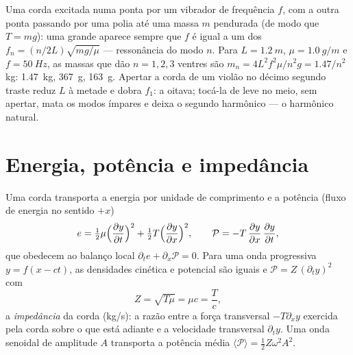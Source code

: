 \begin{example}\label{ex:b2:waves-on-strings:melde}
Uma corda excitada numa ponta por um vibrador de frequência $f$, com a outra ponta
passando por uma polia até uma massa $m$ pendurada (de modo que $T = mg$): uma grande
 aparece sempre que $f$ é igual a um dos $f_n = (n/2L)
\sqrt{mg/\mu}$ --- ressonância do modo $n$. Para $L = \qty{1.2}{m}$, $\mu =
\qty{1.0}{g/m}$ e $f = \qty{50}{Hz}$, as massas que dão $n = 1, 2, 3$ ventres
são $m_n = 4L^2f^2\mu/n^2g = 1.47/n^2$ kg: \qty{1.47}{kg}, \qty{367}{g}, \qty{163}{g}.
Apertar a corda de um violão no décimo segundo traste reduz $L$ à metade e dobra
$f_1$: a oitava; tocá-la de leve no meio, sem apertar,
mata os modos ímpares e deixa o segundo harmônico --- o harmônico natural.
\end{example}

\section{Energia, potência e impedância}

\begin{proposition}\label{prop:b2:waves-on-strings:energy}
Uma corda transporta a energia por unidade de comprimento e a potência (fluxo
de energia no sentido $+x$)
\[
e = \tfrac12\mu\Bigl(\frac{\partial y}{\partial t}\Bigr)^2 + \tfrac12T\Bigl(\frac{\partial y}{\partial x}\Bigr)^2 ,
\qquad
\mathcal P = -T\,\frac{\partial y}{\partial x}\,\frac{\partial y}{\partial t} ,
\]
que obedecem ao balanço local $\partial_te + \partial_x\mathcal P = 0$. Para uma
onda progressiva $y = f(x - ct)$, as densidades cinética e potencial são
iguais e $\mathcal P = Z\,(\partial_ty)^2$ com
\[
Z = \sqrt{T\mu} = \mu c = \frac Tc ,
\]
a \emph{impedância} da corda (\unit{kg/s}): a razão entre a força
transversal $-T\partial_xy$ exercida pela corda sobre o que está adiante
e a velocidade transversal $\partial_ty$. Uma onda senoidal de amplitude $A$
transporta a potência média $\langle\mathcal P\rangle = \tfrac12Z\omega^2A^2$.
\end{proposition}

